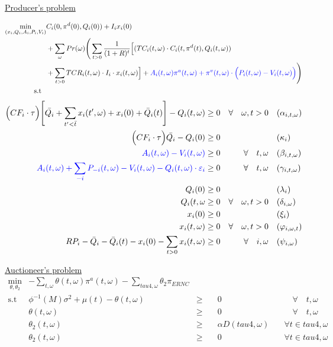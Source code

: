 \documentclass[11pt, letterpaper]{article}
\newcommand{\pia}{\textcolor[rgb]{0,0,1}}
\begin{document}
\underline{Producer's problem}

\begin{align}
\min_{(x_i,Q_i,A_i,P_i,V_i)} &  C_i(0, \pi^d(0),Q_i(0))+ I_i x_i(0) \nonumber \\ &+\sum_{\omega} Pr(\omega)   \Bigg( \sum_{t>0} \frac{1}{(1+R)^t} \Big[ (TC_i(t,\omega)\cdot C_i(t,\pi^d(t),Q_i(t,\omega) )  \nonumber \\
 & + \sum_{t > 0} TCR_i(t,\omega) \cdot I_i\cdot x_i(t,\omega) \Big] + \pia{A_i(t,\omega)\pi^a(t,\omega)+\pi^v(t,\omega)\cdot \Big(P_i(t,\omega)-V_i(t,\omega)\Big)} \Bigg)  \\
     \textrm{s.t \ } \nonumber
\end{align}
\begin{align}
    \Big(CF_i \cdot\tau\Big)  \Bigg[\bar{Q_i} + \sum_{t^{\prime}<\bar{t}} x_i(t^\prime,\omega) + x_i(0)+ \bar{Q}_i(t) \Bigg] - Q_i(t,\omega) & \geq 0  & \forall  \quad \omega, t  > 0 & \quad (\alpha_{i,t,\omega}) \\
    \Big(CF_i\cdot\tau \Big)\bar{Q_i}-Q_{i}(0) & \geq 0  &  \quad & \quad (\kappa_i) \\
\pia{A_i(t,\omega) - V_i(t,\omega) } & \geq  0  & \forall  \quad t,\omega & \quad (\beta_{i,t,\omega})\\
  \pia{ A_i(t,\omega) + \sum_{-i}P_{-i}(t,\omega) - V_i(t,\omega)-Q_i(t, \omega)\cdot \varepsilon_{i}} & \geq  0  &\forall \quad t,\omega & \quad (\gamma_{i,t,\omega})\\
 Q_i(0) & \geq  0 & \quad & \quad (\lambda_i)\\
 Q_i(t, \omega & \geq  0   & \forall  \quad \omega, t >0 & \quad (\delta_{i,\omega})\\
  x_i(0) & \geq  0 & \quad & \quad (\xi_i)\\
  x_i(t, \omega) & \geq  0   & \forall  \quad \omega, t >0 & \quad (\varphi_{i,\omega,t})\\
 RP_i - \bar{Q}_i - \bar{Q}_i(t) - x_i(0) - \sum_{t > 0} x_i(t,\omega)  &  \geq 0 &  \forall \quad i,\omega &  \quad (\psi_{i,\omega}) 
  \end{align}

\underline{Auctioneer's problem}
\pia{
\begin{align}
    \min_{\theta, \theta_2} & -\sum_{t,\omega} \theta(t,\omega) \pi^{a}(t,\omega) - \sum_{tau4,\omega} \theta_2 \pi_{ERNC}  & &  &\\
    \textrm{s.t \ } &  \phi^{-1}(M) \sigma^2 + \mu(t) - \theta(t,\omega) &  \geq & \quad 0  &\quad \quad  \forall  \quad t,\omega\\
    &  \theta(t,\omega)  & \geq & \quad 0 & \quad \quad  \forall \quad t,\omega\\
    & \theta_2(t,\omega) & \geq & \quad  \alpha D(tau4,\omega) & \quad \forall t \in tau4,\omega \\
    & \theta_2(t,\omega) & \geq & \quad 0 & \quad \forall t \in tau4,\omega 
\end{align}
}
\vspace{0.5cm}
\end{document}
